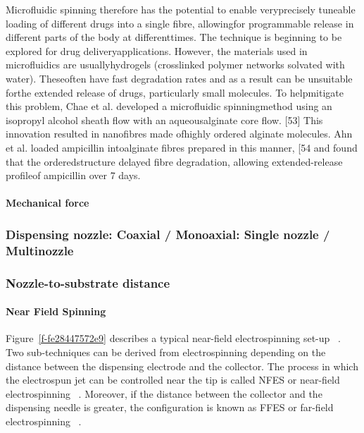 \documentclass[5p,,preprint,12pt,twocolumn]{elsarticle}
\begin{document}
Microfluidic spinning therefore has the potential to enable veryprecisely tuneable loading of different drugs into a single fibre, allowingfor programmable release in different parts of the body at differenttimes. The technique is beginning to be explored for drug deliveryapplications. However, the materials used in microfluidics are usuallyhydrogels (crosslinked polymer networks solvated with water). Theseoften have fast degradation rates and as a result can be unsuitable forthe extended release of drugs, particularly small molecules. To helpmitigate this problem, Chae et al. developed a microfluidic spinningmethod using an isopropyl alcohol sheath flow with an aqueousalginate core flow. [53] This innovation resulted in nanofibres made ofhighly ordered alginate molecules. Ahn et al. loaded ampicillin intoalginate fibres prepared in this manner, [54 and found that the orderedstructure delayed fibre degradation, allowing extended-release profileof ampicillin over 7 days.



\paragraph{Mechanical force}



\subsubsection{Dispensing nozzle: Coaxial / Monoaxial: Single nozzle / Multinozzle}



\subsubsection{Nozzle-to-substrate distance}



\paragraph{Near Field Spinning}Figure~\ref{f-fe28447572e9} describes a typical near-field electrospinning set-up \unskip~\cite{527120:12073538}. Two sub-techniques can be derived from electrospinning depending on the distance between the dispensing electrode and the collector. The process in which the electrospun jet can be controlled near the tip is called NFES or near-field electrospinning \unskip~\cite{527120:12033655}. Moreover, if the distance between the collector and the dispensing needle is greater, the configuration is known as FFES or far-field electrospinning \unskip~\cite{527120:12073581}.
\end{document}
